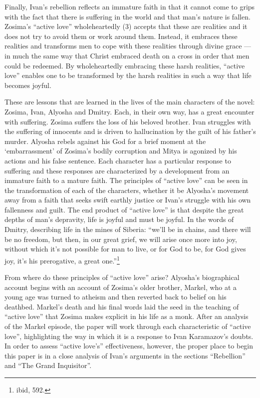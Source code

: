 Finally, Ivan's rebellion reflects an immature faith in that it cannot come to grips with the fact that there is suffering in the world and that man's nature is fallen. Zosima's ``active love'' wholeheartedly (3) accepts that these are realities and it does not try to avoid them or work around them. Instead, it embraces these realities and transforms men to cope with these realities through divine grace --- in much the same way that Christ embraced death on a cross in order that men could be redeemed. By wholeheartedly embracing these harsh realities, ``active love'' enables one to be transformed by the harsh realities in such a way that life becomes joyful.

These are lessons that are learned in the lives of the main characters of the novel: Zosima, Ivan, Alyosha and Dmitry. Each, in their own way, has a great encounter with suffering. Zosima suffers the loss of his beloved brother. Ivan struggles with the suffering of innocents and is driven to hallucination by the guilt of his father's murder. Alyosha rebels against his God for a brief moment at the `embarrassment' of Zosima's bodily corruption and Mitya is agonized by his actions and his false sentence. Each character has a particular response to suffering and these responses are characterized by a development from an immature faith to a mature faith. The principles of ``active love'' can be seen in the transformation of each of the characters, whether it be Alyosha's movement away from a faith that seeks swift earthly justice or Ivan's struggle with his own fallenness and guilt. The end product of ``active love'' is that despite the great depths of man's depravity, life is joyful and must be joyful. In the words of Dmitry, describing life in the mines of Siberia: ``we'll be in chains, and there will be no freedom, but then, in our great grief, we will arise once more into joy, without which it's not possible for man to live, or for God to be, for God gives joy, it's his prerogative, a great one.''\footnote{ibid, 592.}

From where do these principles of ``active love'' arise? Alyosha's biographical account begins with an account of Zosima's older brother, Markel, who at a young age was turned to atheism and then reverted back to belief on his deathbed. Markel's death and his final words laid the seed in the teaching of ``active love'' that Zosima makes explicit in his life as a monk. After an analysis of the Markel episode, the paper will work through each characteristic of ``active love'', highlighting the way in which it is a response to Ivan Karamazov's doubts. In order to assess ``active love's'' effectiveness, however, the proper place to begin this paper is in a close analysis of Ivan's arguments in the sections ``Rebellion'' and ``The Grand Inquisitor''.

